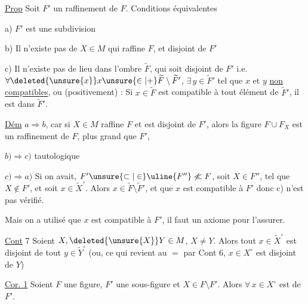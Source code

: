 \uline{Prop} Soit $F'$ un raffinement de $F$. Conditions équivalentes

a) $F'$ est une subdivision

b) Il n'existe pas de $X\in M$ qui raffine $F$, et disjoint de $F'$

c)  Il n'existe pas de lieu dans l'ombre $\widetilde F$, qui soit disjoint de $F'$ i.e.  $\forall\deleted{\unsure{x}}x\unsure{\in|+}\widetilde F\setminus\widetilde F'$, $\exists\,y\in\widetilde F'$ tel que $x$ et $y$ \uline{non compatibles}, ou (positivement) : Si $x\in\widetilde F$ est compatible à tout élément de $\widetilde F'$, il est dans $\widetilde F'$.

\uline{Dém} $a\Longrightarrow b$, car si $X\in M$ raffine $F$ et est disjoint de $F'$, alors la figure $F\cup F_X$ est un raffinement de $F$,  plus grand que $F'$,

$b)\Longrightarrow c)$ tautologique

$c)\Longrightarrow a)$ Si on avait, $F'\unsure{\subset|\in} \uline{F''}\not\ll F$, soit $X\in F''$, tel que $X\notin F'$, et soit $x\in\widetilde X^\circ$. Alors $x\in\widetilde F\setminus\widetilde F'$, et  que $x$ est compatible à $F'$ donc c) n'est pas vérifié.

Mais on a utilisé que $x$ est compatible à $F'$, il faut un axiome pour l'assurer.

\uline{Cont} 7 Soient $X,\deleted{\unsure{X}}Y\in M$,  $X\ne Y$.  Alors tout $x\in\widetilde X^\circ$ est disjoint de tout $y\in\widetilde Y^\circ$ (ou, ce qui revient au $=$ par Cont 6,  $x\in X^\circ$ est disjoint de $Y$)

\uline{Cor. 1} Soient $F$ une figure, $F'$ une sous-figure et $X\in F\setminus F'$. Alors $\forall\,x\in X^\circ$ est   de $F'$.
